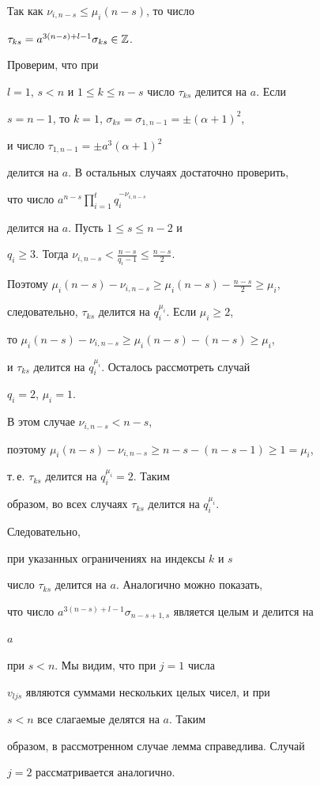 \begin{pf}
Так как $\nu_{i,n-s}\le\mu_i(n-s)$, то число 


$\tau_{ks}=a^{3(n-s)+l-1}\sigma_{ks}\in\Bbb Z$. 


Проверим, что при 


$l=1$, $s<n$ и $1\le k\le n-s$ число $\tau_{ks}$ делится на $a$. Если 


$s=n-1$, то $k=1$, $\sigma_{ks}=\sigma_{1,n-1}=\pm(\alpha+1)^2$, 


и число $\tau_{1,n-1}=\pm a^3(\alpha+1)^2$ 


делится на $a$. В остальных случаях достаточно проверить, 


что число $a^{n-s}\prod\limits^t_{i=1}q^{-\nu_{i,n-s}}_i$ 


делится на $a$. Пусть $1\le s\le n-2$ и 


$q_i\ge3$. Тогда $\nu_{i,n-s}<\frac{n-s}{q_i-1}\le\frac{n-s}{2}$. 


Поэтому $\mu_i(n-s)-\nu_{i,n-s}\ge\mu_i(n-s)-\frac{n-s}{2}\ge\mu_i$, 


следовательно, $\tau_{ks}$ делится на $q^{\mu_i}_i$. Если $\mu_i\ge2$, 


то $\mu_i(n-s)-\nu_{i,n-s}\ge\mu_i(n-s)-(n-s)\ge\mu_i$, 


и $\tau_{ks}$ делится на $q^{\mu_i}_i$. Осталось рассмотреть случай 


$q_i=2$, $\mu_i=1$. 


В этом случае $\nu_{i,n-s}<n-s$, 


поэтому $\mu_i(n-s)-\nu_{i,n-s}\ge n-s-(n-s-1)\ge1=\mu_i$, 


т.\,е. $\tau_{ks}$ делится на $q^{\mu_i}_i=2$. Таким 


образом, во всех случаях $\tau_{ks}$ делится на $q^{\mu_i}_i$. 


Следовательно, 


при указанных ограничениях на индексы $k$ и $s$ 


число $\tau_{ks}$ делится на $a$. Аналогично можно показать, 


что число $a^{3(n-s)+l-1}\sigma_{n-s+1,s}$ является целым и делится на 


$a$ 


при $s<n$. Мы видим, что при $j=1$ числа 


$v_{ljs}$ являются суммами нескольких целых чисел, и при 


$s<n$ все слагаемые делятся на $a$. Таким 


образом, в рассмотренном случае лемма справедлива. Случай 


$j=2$ рассматривается аналогично. 


\end{pf} 


